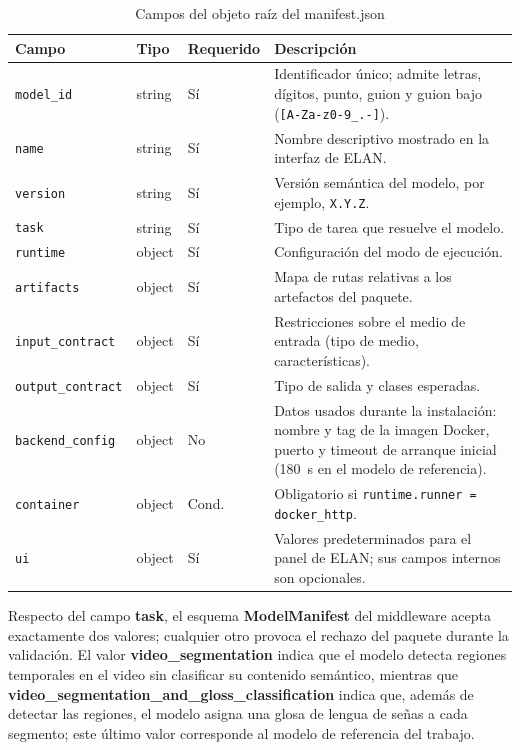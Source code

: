 \documentclass[11pt,a4paper]{article}
\begin{document}
\begin{table}[H]
\centering
\caption{Campos del objeto raíz del manifest.json}
\label{tab:manifest_root}
\scriptsize
\renewcommand{\arraystretch}{1.08}
\setlength{\tabcolsep}{3.5pt}

\begin{tabular}{
    >{\raggedright\arraybackslash}p{3.0cm}
    >{\raggedright\arraybackslash}p{1.6cm}
    >{\centering\arraybackslash}p{1.8cm}
    >{\raggedright\arraybackslash}p{6.3cm}
}
\toprule
\textbf{Campo} & \textbf{Tipo} & \textbf{Requerido} & \textbf{Descripción} \\
\midrule
\texttt{model\_id} & string & Sí & Identificador único; admite letras, dígitos, punto, guion y guion bajo (\texttt{[A-Za-z0-9\_.-]}). \\
\texttt{name} & string & Sí & Nombre descriptivo mostrado en la interfaz de ELAN. \\
\texttt{version} & string & Sí & Versión semántica del modelo, por ejemplo, \texttt{X.Y.Z}. \\
\texttt{task} & string & Sí & Tipo de tarea que resuelve el modelo. \\
\texttt{runtime} & object & Sí & Configuración del modo de ejecución. \\
\texttt{artifacts} & object & Sí & Mapa de rutas relativas a los artefactos del paquete. \\
\texttt{input\_contract} & object & Sí & Restricciones sobre el medio de entrada (tipo de medio, características). \\
\texttt{output\_contract} & object & Sí & Tipo de salida y clases esperadas. \\
\texttt{backend\_config} & object & No & Datos usados durante la instalación: nombre y tag de la imagen Docker, puerto y timeout de arranque inicial (180~s en el modelo de referencia). \\
\texttt{container} & object & Cond. & Obligatorio si \texttt{runtime.runner = docker\_http}. \\
\texttt{ui} & object & Sí & Valores predeterminados para el panel de ELAN; sus campos internos son opcionales. \\
\bottomrule
\end{tabular}
\end{table}

Respecto del campo \textbf{task}, el esquema \textbf{ModelManifest} del middleware acepta exactamente dos valores; cualquier otro provoca el rechazo del paquete durante la validación. El valor \textbf{video\_segmentation} indica que el modelo detecta regiones temporales en el video sin clasificar su contenido semántico, mientras que \textbf{video\_segmentation\_and\_gloss\_classification} indica que, además de detectar las regiones, el modelo asigna una glosa de lengua de señas a cada segmento; este último valor corresponde al modelo de referencia del trabajo.
\end{document}
